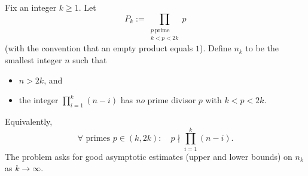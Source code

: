 Fix an integer $k\ge 1$. Let
\[
P_k:=\prod_{\substack{p\ \text{prime}\\ k<p<2k}} p
\]
(with the convention that an empty product equals $1$). Define $n_k$ to be the smallest integer $n$ such that
\begin{itemize}
\item $n>2k$, and
\item the integer $\prod_{i=1}^k (n-i)$ has \emph{no} prime divisor $p$ with $k<p<2k$.
\end{itemize}
Equivalently,
\[
\forall\text{ primes }p\in (k,2k):\quad p\nmid\prod_{i=1}^k(n-i).
\]
The problem asks for good asymptotic estimates (upper and lower bounds) on $n_k$ as $k\to\infty$.
